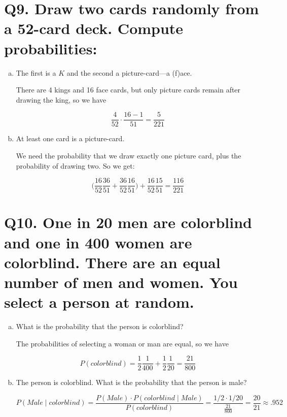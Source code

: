 \documentclass{article}
\begin{document}
\section*{Q9. \normalsize Draw two cards randomly from a 52-card deck. Compute probabilities:}

\begin{enumerate}[(a)]
  \item The first is a $K$ and the second a picture-card---a (f)ace.

    There are 4 kings and 16 face cards, but only picture cards remain after drawing the king, so we have

    $$\frac{4}{52}\cdot\frac{16-1}{51} = \frac{5}{221}$$
  \item At least one card is a picture-card.

    We need the probability that we draw exactly one picture card, plus the probability of drawing two. So we get:

    $$\Big(\frac{16}{52}\frac{36}{51} + \frac{36}{52}\frac{16}{51}\Big) + \frac{16}{52}\frac{15}{51} = \frac{116}{221}$$
\end{enumerate}



\section*{Q10. \normalsize One in 20 men are colorblind and one in 400 women are colorblind. There are an equal number of men and women. You select a person at random.}

\begin{enumerate}[(a)]
  \item What is the probability that the person is colorblind?

    The probabilities of selecting a woman or man are equal, so we have

    $$P(colorblind) = \frac{1}{2}\frac{1}{400} + \frac{1}{2}\frac{1}{20} = \frac{21}{800}$$
  \item The person is colorblind. What is the probability that the person is male?

    $$P(Male \mid colorblind) = \frac{P(Male)\cdot P(colorblind \mid Male)}{P(colorblind)} = \frac{1/2 \cdot 1/20}{\frac{21}{800}} = \frac{20}{21} \approx .952$$
\end{enumerate}
\end{document}
